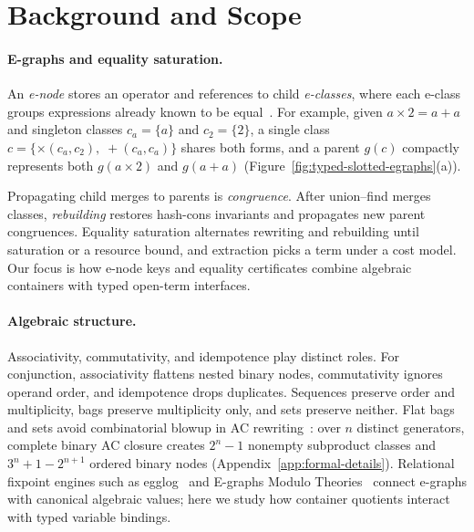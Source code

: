 \section{Background and Scope}
\label{sec:background}

\paragraph{E-graphs and equality saturation.}
An \emph{e-node} stores an operator and references to child \emph{e-classes},
where each e-class groups expressions already known to be equal~\cite{ogEgraphs1,egraphsOG,egg}.
For example, given $a\times 2=a+a$ and singleton classes $c_a=\{a\}$ and
$c_2=\{2\}$, a single class $c=\{\times(c_a,c_2),\;+(c_a,c_a)\}$ shares both
forms, and a parent $g(c)$ compactly represents both $g(a\times 2)$ and
$g(a+a)$ (Figure~\ref{fig:typed-slotted-egraphs}(a)).

Propagating child merges to parents is \emph{congruence}. After union--find
merges classes, \emph{rebuilding} restores hash-cons invariants and propagates
new parent congruences. Equality saturation alternates rewriting and rebuilding
until saturation or a resource bound, and extraction picks a term under a cost
model. Our focus is how e-node keys and equality certificates combine algebraic
containers with typed open-term interfaces.

\paragraph{Algebraic structure.}
Associativity, commutativity, and idempotence play distinct roles. For
conjunction, associativity flattens nested binary nodes, commutativity ignores
operand order, and idempotence drops duplicates. Sequences preserve order and
multiplicity, bags preserve multiplicity only, and sets preserve neither. Flat
bags and sets avoid combinatorial blowup in AC rewriting~\cite{conchon2012canonized,kapur2021ModularAC}:
over $n$ distinct generators, complete binary AC closure creates $2^n-1$
nonempty subproduct classes and $3^n+1-2^{n+1}$ ordered binary nodes
(Appendix~\ref{app:formal-details}). Relational fixpoint engines such as
egglog~\cite{egglog,egglog_software} and E-graphs Modulo
Theories~\cite{zucker2025omeletsneedonionsegraphs} connect e-graphs with
canonical algebraic values; here we study how container quotients interact with
typed variable bindings.

